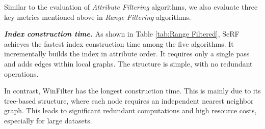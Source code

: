 \documentclass[sigconf, nonacm]{acmart}
\begin{document}
\begin{sloppypar}
\begin{table}[htbp]
\centering
\setlength{\abovecaptionskip}{0.05cm}
\caption{Time and space overhead of range filtering index construction}
\label{tab:Range Filtered}
\end{table}
Similar to the evaluation of \textit{Attribute Filtering} algorithms, we also evaluate three key metrics mentioned above in \textit{Range Filtering} algorithms.

\vspace{0.5em}
\textit{\textbf{Index construction time.}}
As shown in Table \ref{tab:Range Filtered}, SeRF achieves the fastest index construction time among the five algorithms. It incrementally builds the index in attribute order. It requires only a single pass and adds edges within local graphs. The structure is simple, with no redundant operations.

In contrast, WinFilter has the longest construction time. This is mainly due to its tree-based structure, where each node requires an independent nearest neighbor graph. This leads to significant redundant computations and high resource costs, especially for large datasets.


\end{sloppypar}
\end{document}
